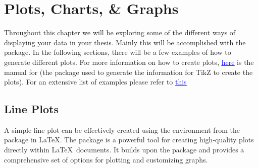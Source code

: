 \chapter{Plots, Charts, \& Graphs}\label{ch:plotsandgraphs}
		Throughout this chapter we will be exploring some of the different ways of displaying your data in your thesis.
		Mainly this will be accomplished with the  package.
		In the following sections, there will be a few examples of how to generate different plots.
		For more information on how to create plots, \href{https://mirror.its.dal.ca/ctan/graphics/pgf/contrib/pgfplots/doc/pgfplots.pdf}{\textcolor{blue}{\underline{here}}} is the manual for (the package used to generate the information for TikZ to create the plots).
		For an extensive list of examples please refer to \href{https://pgfplots.sourceforge.net/gallery.html}{\textcolor{blue}{\underline{this}}}

	\section{Line Plots}
		A simple line plot can be effectively created using the  environment from the  package in \LaTeX. 
		The  package is a powerful tool for creating high-quality plots directly within \LaTeX\ documents. 
		It builds upon the  package and provides a comprehensive set of options for plotting and customizing graphs.


